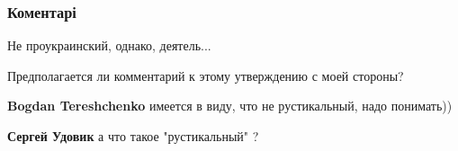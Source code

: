  
 
 
 
 
\subsubsection{Коментарі}
\label{sec:13_05_2021.fb.mashkevich_stefan.1.gorod_bulgakov.cmt}

\begin{itemize}
 
Не проукраинский, однако, деятель...

\begin{itemize}
 
Предполагается ли комментарий к этому утверждению с моей стороны? \Smiley[1.0][yellow]

 
\textbf{Bogdan Tereshchenko} имеется в виду, что не рустикальный, надо понимать))

 
\textbf{Сергей Удовик} а что такое "рустикальный" ?

 

\end{itemize}
\end{itemize}
